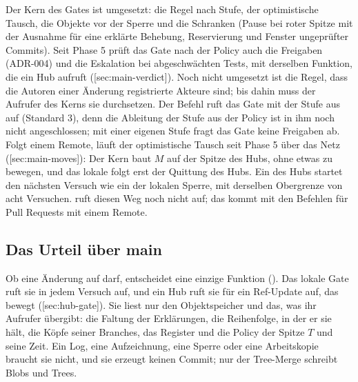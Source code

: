 Der Kern des Gates ist umgesetzt: die Regel nach Stufe, der optimistische Tausch, die Objekte vor
der Sperre und die Schranken (Pause bei roter Spitze mit der Ausnahme für eine erklärte Behebung,
Reservierung und Fenster ungeprüfter Commits).
Seit Phase 5 prüft das Gate nach der Policy auch die Freigaben (ADR-004) und die Eskalation bei
abgeschwächten Tests, mit derselben Funktion, die ein Hub aufruft
([sec:main-verdict]).
Noch nicht umgesetzt ist die Regel, dass die Autoren einer Änderung registrierte Akteure sind;
bis dahin muss der Aufrufer des Kerns sie durchsetzen.
Der Befehl  ruft das Gate mit der Stufe aus  auf (Standard 3),
denn die Ableitung der Stufe aus der Policy ist in ihm noch nicht angeschlossen;
mit einer eigenen Stufe fragt das Gate keine Freigaben ab.
Folgt  einem Remote, läuft der optimistische Tausch seit Phase 5 über das Netz
([sec:main-moves]): Der Kern baut $M$ auf der Spitze des Hubs, ohne etwas zu
bewegen, und das lokale  folgt erst der Quittung des Hubs.
Ein  des Hubs startet den nächsten Versuch wie ein  der lokalen Sperre,
mit derselben Obergrenze von acht Versuchen.
 ruft diesen Weg noch nicht auf; das kommt mit den Befehlen für Pull Requests mit
einem Remote.

\subsection[sec:main-verdict]{Das Urteil über main}

Ob eine Änderung auf  darf, entscheidet eine einzige Funktion
().
Das lokale Gate ruft sie in jedem Versuch auf, und ein Hub ruft sie für ein Ref-Update auf, das
 bewegt ([sec:hub-gate]).
Sie liest nur den Objektspeicher und das, was ihr Aufrufer übergibt: die Faltung der
Erklärungen, die Reihenfolge, in der er sie hält, die Köpfe seiner Branches, das Register und die
Policy der Spitze $T$ und seine Zeit.
Ein Log, eine Aufzeichnung, eine Sperre oder eine Arbeitskopie braucht sie nicht, und sie
erzeugt keinen Commit; nur der Tree-Merge schreibt Blobs und Trees.

